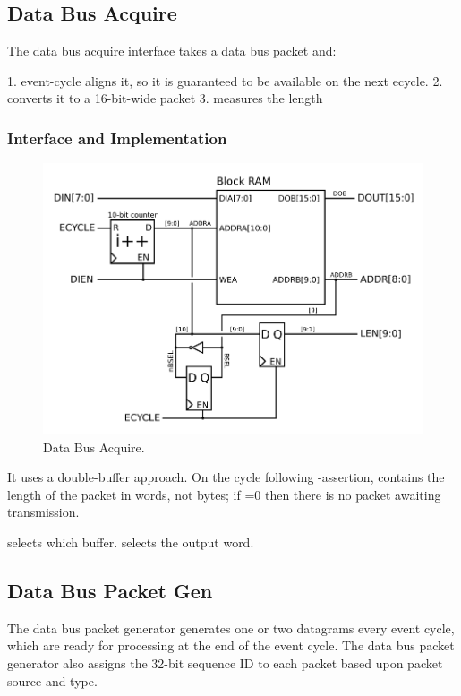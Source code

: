 \subsection{Data Bus Acquire}
The data bus acquire interface takes a data bus packet and: 

1. event-cycle aligns it, so it is guaranteed to be available on the
   next ecycle.
2. converts it to a 16-bit-wide packet
3. measures the length

\subsubsection{Interface and Implementation} 
 \begin{figure}
\begin{centering}
\includegraphics[scale=0.8]{data.acquire.svg}
\end{centering}
\caption{Data Bus Acquire.}
\label{data.acquire}
\end{figure}

It uses a double-buffer approach. On the cycle following
-assertion,  contains the length of
the packet in words, not bytes; if  =0 then there is
no packet awaiting transmission.

 selects which buffer.  selects the
output word.

\subsection{Data Bus Packet Gen}
The data bus packet generator generates one or two datagrams every
event cycle, which are ready for processing at the end of the event
cycle.
The data bus packet generator also assigns the 32-bit sequence ID to
each packet based upon packet source and type.


